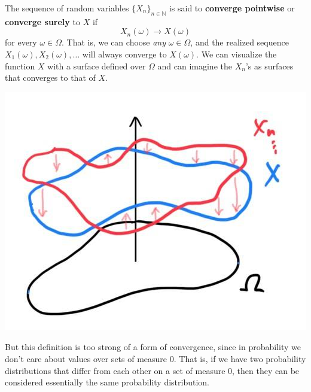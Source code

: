 \documentclass{article}
\begin{document}
    \begin{definition}
      The sequence of random variables $\{ X_n\}_{n \in \mathbb{N}}$ is said to \textbf{converge pointwise} or \textbf{converge surely} to $X$ if 
      \begin{equation}
        X_n (\omega) \rightarrow X (\omega)
      \end{equation}
      for every $\omega \in \Omega$. That is, we can choose \textit{any} $\omega \in \Omega$, and the realized sequence $X_1 (\omega), X_2 (\omega), \ldots$ will always converge to $X(\omega)$. We can visualize the function $X$ with a surface defined over $\Omega$ and can imagine the $X_n$'s as surfaces that converges to that of $X$. 
      \begin{center}
        \includegraphics[scale=0.3]{img/sure_convergence.jpg}
      \end{center}
    \end{definition}

    But this definition is too strong of a form of convergence, since in probability we don't care about values over sets of measure $0$. That is, if we have two probability distributions that differ from each other on a set of measure $0$, then they can be considered essentially the same probability distribution. 
\end{document}
